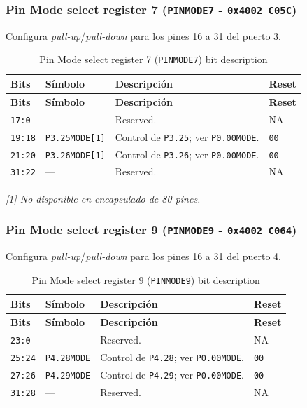 \subsubsection{Pin Mode select register 7 (\texttt{PINMODE7} - \texttt{0x4002 C05C})}
Configura \textit{pull-up}/\textit{pull-down} para los pines 16 a 31 del puerto 3.

\begin{longtable}{|>{\raggedright\arraybackslash}p{}|>{\raggedright\arraybackslash}p{}|>{\raggedright\arraybackslash}p{}|>{\centering\arraybackslash}p{}|}
\caption{Pin Mode select register 7 (\texttt{PINMODE7}) bit description}\\
\hline
\textbf{Bits} & \textbf{Símbolo} & \textbf{Descripción} & \textbf{Reset} \\
\hline
\endfirsthead
\hline
\textbf{Bits} & \textbf{Símbolo} & \textbf{Descripción} & \textbf{Reset} \\
\hline
\endhead
\texttt{17:0} & --- & Reserved. & NA \\
\hline
\texttt{19:18} & \texttt{P3.25MODE[1]} & Control de \texttt{P3.25}; ver \texttt{P0.00MODE}. & \texttt{00} \\
\hline
\texttt{21:20} & \texttt{P3.26MODE[1]} & Control de \texttt{P3.26}; ver \texttt{P0.00MODE}. & \texttt{00} \\
\hline
\texttt{31:22} & --- & Reserved. & NA \\
\hline
\end{longtable}
\noindent\textit{[1] No disponible en encapsulado de 80 pines.}

\subsubsection{Pin Mode select register 9 (\texttt{PINMODE9} - \texttt{0x4002 C064})}
Configura \textit{pull-up}/\textit{pull-down} para los pines 16 a 31 del puerto 4.

\begin{longtable}{|>{\raggedright\arraybackslash}p{}|>{\raggedright\arraybackslash}p{}|>{\raggedright\arraybackslash}p{}|>{\centering\arraybackslash}p{}|}
\caption{Pin Mode select register 9 (\texttt{PINMODE9}) bit description}\\
\hline
\textbf{Bits} & \textbf{Símbolo} & \textbf{Descripción} & \textbf{Reset} \\
\hline
\endfirsthead
\hline
\textbf{Bits} & \textbf{Símbolo} & \textbf{Descripción} & \textbf{Reset} \\
\hline
\endhead
\texttt{23:0} & --- & Reserved. & NA \\
\hline
\texttt{25:24} & \texttt{P4.28MODE} & Control de \texttt{P4.28}; ver \texttt{P0.00MODE}. & \texttt{00} \\
\hline
\texttt{27:26} & \texttt{P4.29MODE} & Control de \texttt{P4.29}; ver \texttt{P0.00MODE}. & \texttt{00} \\
\hline
\texttt{31:28} & --- & Reserved. & NA \\
\hline
\end{longtable}

